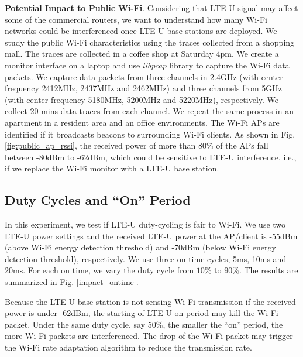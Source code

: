 \textbf{Potential Impact to Public Wi-Fi}.
Considering that LTE-U signal may affect some of the
commercial routers, we want to understand how many
Wi-Fi networks could be interferenced once
LTE-U base stations are deployed. 
We study the public Wi-Fi characteristics using the traces collected 
from a shopping mall. 
The traces are collected in a coffee shop at Saturday 4pm. 
We create a monitor interface on a laptop and use \emph{libpcap}
library to capture the Wi-Fi data packets. 
We capture data packets from three channels in 2.4GHz 
(with center frequency 2412MHz, 2437MHz and 2462MHz) and
three channels from 5GHz (with center frequency 5180MHz, 5200MHz and 5220MHz), respectively. 
We collect 20 mins data traces from each channel. 
We repeat the same process in an apartment in a 
resident area and an office environments.
The Wi-Fi APs are identified if it broadcasts 
beacons to surrounding Wi-Fi clients. 
As shown in Fig. \ref{fig:public_ap_rssi}, 
the received power of more than 80\% of the APs 
fall between -80dBm to -62dBm, 
which could be sensitive to LTE-U interference, 
i.e., if we replace the Wi-Fi monitor 
with a LTE-U base station. 






\subsection{Duty Cycles and ``On'' Period}



In this experiment, we test if LTE-U duty-cycling is fair to Wi-Fi. 
We use two LTE-U power settings and the received LTE-U power at
the AP/client is -55dBm (above Wi-Fi energy detection threshold) 
and -70dBm (below Wi-Fi energy detection threshold), respectively.  
We use three on time cycles, 5ms, 10ms and 20ms. 
For each on time, we vary the duty cycle from $10\%$ to $90\%$. 
The results are summarized in Fig. \ref{impact_ontime}.

Because the LTE-U base station is not sensing Wi-Fi transmission
if the received power is under -62dBm, 
the starting of LTE-U on period may kill the Wi-Fi packet. 
Under the same duty cycle, say 50\%, 
the smaller the ``on'' period, the more Wi-Fi packets
are interferenced.
The drop of the Wi-Fi packet may trigger the Wi-Fi
rate adaptation algorithm to reduce the transmission rate. 
 

